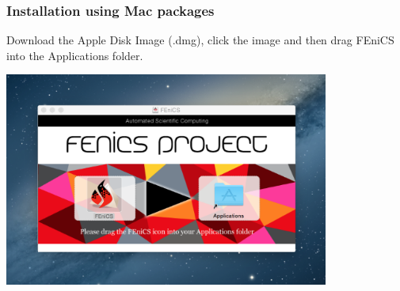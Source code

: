 \begin{frame}[fragile]
  \frametitle{Installation using Mac packages}

  Download the Apple Disk Image (.dmg), click the image and then drag
  FEniCS into the Applications folder.

  \begin{center}
    \includegraphics[width=0.8\textwidth]{png/installation_mac.png}
  \end{center}

\end{frame}
